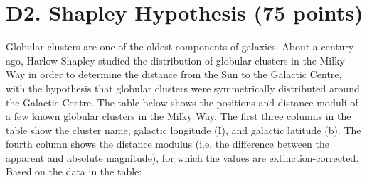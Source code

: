 \documentclass[10pt]{article}
\begin{document}
\section*{D2. Shapley Hypothesis (75 points)}
Globular clusters are one of the oldest components of galaxies. About a century ago, Harlow Shapley studied the distribution of globular clusters in the Milky Way in order to determine the distance from the Sun to the Galactic Centre, with the hypothesis that globular clusters were symmetrically distributed around the Galactic Centre. The table below shows the positions and distance moduli of a few known globular clusters in the Milky Way. The first three columns in the table show the cluster name, galactic longitude (I), and galactic latitude (b). The fourth column shows the distance modulus (i.e. the difference between the apparent and absolute magnitude), for which the values are extinction-corrected. Based on the data in the table:
\end{document}
